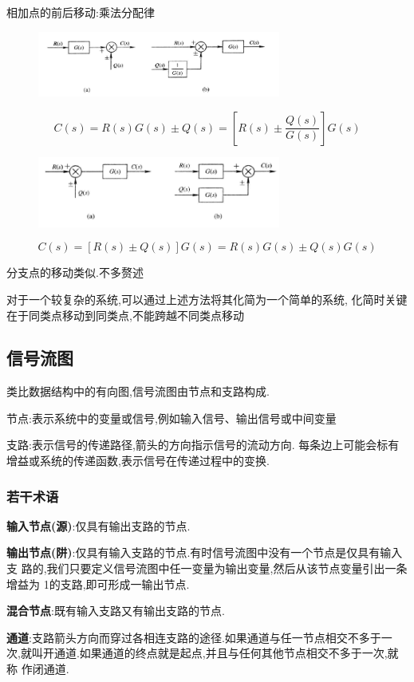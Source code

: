 \documentclass[12pt,a4paper,oneside]{ctexart}
\begin{document}
相加点的前后移动:乘法分配律
\begin{figure}[H]
    \centering
    \includegraphics[width=8cm]{photos/相加点前移.png}
\end{figure}
\[
    C(s)=R(s)G(s)\pm Q(s)=[R(s)\pm \frac{Q(s)}{G(s)}]G(s)
\]
\begin{figure}[H]
    \centering
    \includegraphics[width=8cm]{photos/相加点后移.png}
\end{figure}
\[
    C(s)=[R(s)\pm Q(s)]G(s)=R(s)G(s)\pm Q(s)G(s)
\]

分支点的移动类似.不多赘述

对于一个较复杂的系统,可以通过上述方法将其化简为一个简单的系统,
化简时关键在于同类点移动到同类点,不能跨越不同类点移动

\subsection{信号流图}
类比数据结构中的有向图,信号流图由节点和支路构成.

节点:表示系统中的变量或信号,例如输入信号、输出信号或中间变量

支路:表示信号的传递路径,箭头的方向指示信号的流动方向.
每条边上可能会标有增益或系统的传递函数,表示信号在传递过程中的变换.

\subsubsection{若干术语}

\textbf{输入节点(源)}:仅具有输出支路的节点.

\textbf{输出节点(阱)}:仅具有输入支路的节点.有时信号流图中没有一个节点是仅具有输入支
路的,我们只要定义信号流图中任一变量为输出变量,然后从该节点变量引出一条增益为
1的支路,即可形成一输出节点.

\textbf{混合节点}:既有输入支路又有输出支路的节点.

\textbf{通道}:支路箭头方向而穿过各相连支路的途径.如果通道与任一节点相交不多于一
次,就叫开通道.如果通道的终点就是起点,并且与任何其他节点相交不多于一次,就称
作闭通道.
\end{document}
